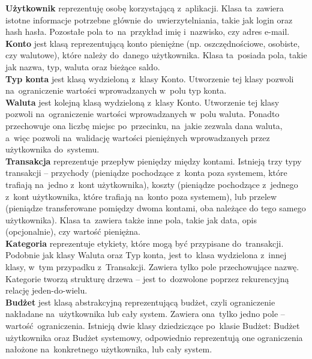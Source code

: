 \textbf{Użytkownik} reprezentuję osobę korzystającą z~aplikacji. Klasa ta~zawiera istotne informacje potrzebne głównie do~uwierzytelniania, takie jak login oraz hash hasła. Pozostałe pola to~na~przykład imię i~nazwisko, czy adres e-mail.\\

\textbf{Konto} jest klasą reprezentującą konto pieniężne (np. oszczędnościowe, osobiste, czy walutowe), które należy do~danego użytkownika. Klasa ta~posiada pola, takie jak nazwa, typ, waluta oraz bieżące saldo.\\

\textbf{Typ konta} jest klasą wydzieloną z~klasy Konto. Utworzenie tej klasy pozwoli na~ograniczenie wartości wprowadzanych w~polu typ konta.\\

\textbf{Waluta} jest kolejną klasą wydzieloną z~klasy Konto. Utworzenie tej klasy pozwoli na~ograniczenie wartości wprowadzanych w~polu waluta. Ponadto przechowuje ona liczbę miejsc po~przecinku, na~jakie zezwala dana waluta, a~więc pozwoli na~walidację wartości pieniężnych wprowadzanych przez użytkownika do~systemu.\\

\textbf{Transakcja} reprezentuje przepływ pieniędzy między kontami. Istnieją trzy typy transakcji -- przychody (pieniądze pochodzące z~konta poza systemem, które trafiają na~jedno z~kont użytkownika), koszty (pieniądze pochodzące z~jednego z~kont użytkownika, które trafiają na~konto poza systemem), lub przelew (pieniądze transferowane pomiędzy dwoma kontami, oba należące do tego samego użytkownika). Klasa ta~zawiera także inne pola, takie jak data, opis (opcjonalnie), czy wartość pieniężna.\\

\textbf{Kategoria} reprezentuje etykiety, które mogą być przypisane do~transakcji. Podobnie jak klasy Waluta oraz Typ konta, jest to~klasa wydzielona z~innej klasy, w~tym przypadku z~Transakcji. Zawiera tylko pole przechowujące nazwę. Kategorie tworzą strukturę drzewa -- jest to~dozwolone poprzez rekurencyjną relację jeden-do-wielu.\\

\textbf{Budżet} jest klasą abstrakcyjną reprezentującą budżet, czyli ograniczenie nakładane na~użytkownika lub cały system. Zawiera ona~tylko jedno pole -- wartość ograniczenia. Istnieją dwie klasy dziedziczące po~klasie Budżet: Budżet użytkownika oraz Budżet systemowy, odpowiednio reprezentują one ograniczenia nałożone na~konkretnego użytkownika, lub cały system.\\

